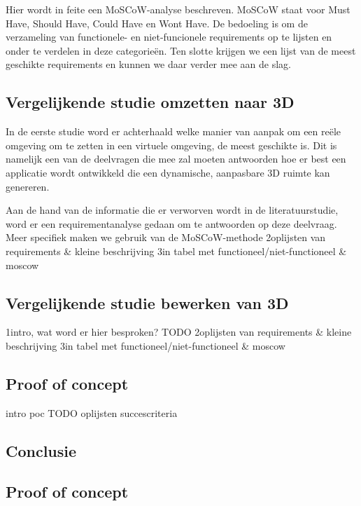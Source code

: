 Hier wordt in feite een MoSCoW-analyse beschreven. MoSCoW staat voor Must Have, Should Have, Could Have en Wont Have. De bedoeling is om de verzameling van functionele- en niet-funcionele requirements op te lijsten en onder te verdelen in deze categorieën. Ten slotte krijgen we een lijst van de meest geschikte requirements en kunnen we daar verder mee aan de slag. 

\subsection{Vergelijkende studie omzetten naar 3D }

In de eerste studie word er achterhaald welke manier van aanpak om een reële omgeving om te zetten in een virtuele omgeving, de meest geschikte is. Dit is namelijk een van de deelvragen die mee zal moeten antwoorden hoe er best een applicatie wordt ontwikkeld die een dynamische, aanpasbare 3D ruimte kan genereren. 

Aan de hand van de informatie die er verworven wordt in de literatuurstudie, word er een requirementanalyse gedaan om te antwoorden op deze deelvraag. Meer specifiek maken we gebruik van de MoSCoW-methode 
2oplijsten van requirements & kleine beschrijving
3in tabel met functioneel/niet-functioneel & moscow 

\subsection{Vergelijkende studie bewerken van 3D }
1intro, wat word er hier besproken? TODO
2oplijsten van requirements & kleine beschrijving
3in tabel met functioneel/niet-functioneel & moscow 


\subsection{Proof of concept}
intro poc TODO
oplijsten succescriteria

\subsection{Conclusie} \subsection{Proof of concept}